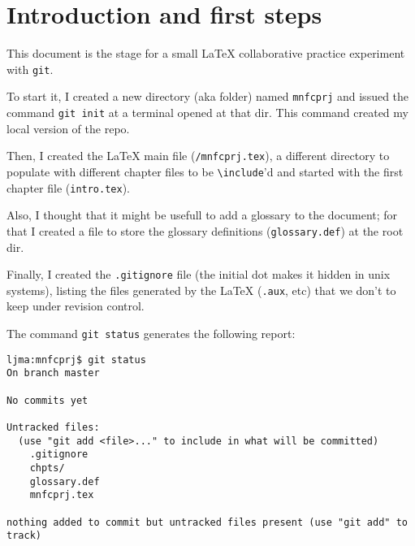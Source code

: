 \chapter{Introduction and first steps}
This document is the stage for a small \LaTeX{} collaborative practice
experiment with \texttt{git}.

To start it, I created a new directory (aka folder) named \texttt{mnfcprj} and
issued the command \texttt{git init} at a terminal opened at that dir. This
command created my local version of the \gls{repo}.

Then, I created the \LaTeX{} main file (\texttt{/mnfcprj.tex}), a different
directory to populate with different chapter files to be
\texttt{\textbackslash{}include}'d and started with the first chapter file
(\texttt{intro.tex}).

Also, I thought that it might be usefull to add a glossary to the document; for
that I created a file to store the glossary definitions (\texttt{glossary.def})
at the root dir. 

Finally, I created the \texttt{.gitignore} file (the initial dot makes it hidden
in unix systems), listing the files generated by the \LaTeX{} (\texttt{.aux},
etc) that we don't to keep under revision control.

The command \texttt{git status} generates the following report:

\noindent
\begin{minipage}{0.96\textwidth}
\begin{verbatim}
ljma:mnfcprj$ git status
On branch master

No commits yet

Untracked files:
  (use "git add <file>..." to include in what will be committed)
	.gitignore
	chpts/
	glossary.def
	mnfcprj.tex

nothing added to commit but untracked files present (use "git add" to track)
\end{verbatim}
\end{minipage}

